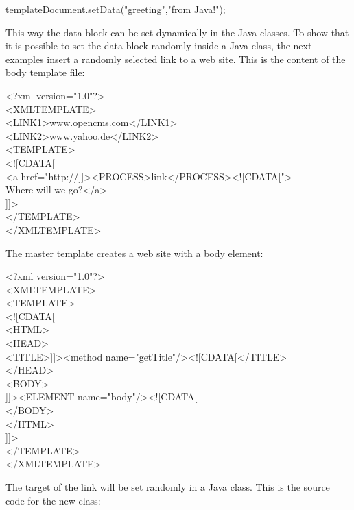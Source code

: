 {\meth templateDocument.setData("greeting","from Java!");}

This way the data block can be set dynamically in the Java classes. To
show that it is possible to set the data block randomly inside a Java
class, the next examples insert a randomly selected link to a web site.
This is the content of the body template file:

\begin{xml}
<?xml version="1.0"?>\\
<XMLTEMPLATE>\\
<LINK1>www.opencms.com</LINK1>\\
<LINK2>www.yahoo.de</LINK2>\\
<TEMPLATE>\\
<![CDATA[\\
<a href="http://]]><PROCESS>link</PROCESS><![CDATA[">\\
Where will we go?</a>\\
]]>\\
</TEMPLATE>\\
</XMLTEMPLATE>\\
\end{xml}

The master template creates a web site with a {\name body} element:

\begin{xml}
<?xml version="1.0"?>\\
<XMLTEMPLATE>\\
<TEMPLATE>\\
\xtaba <![CDATA[\\
\xtaba <HTML>\\
\xtaba <HEAD>\\
\xtaba <TITLE>]]><method name="getTitle"/><![CDATA[</TITLE>\\
\xtaba </HEAD>\\
<BODY>\\
\xtaba ]]><ELEMENT name="body"/><![CDATA[\\
\xtaba </BODY>\\
\xtaba </HTML>\\
\xtaba ]]>\\
</TEMPLATE>\\
</XMLTEMPLATE>\\
\end{xml}

The target of the link will be set randomly in a Java class.
This is the source code for the new class:

